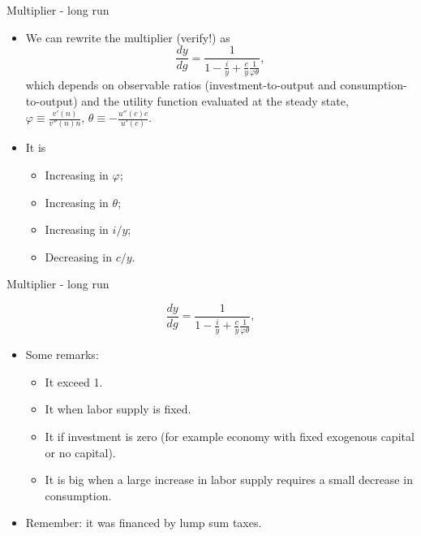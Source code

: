 \documentclass[11pt,xcolor={dvipsnames},aspectratio=159,hyperref={pdftex,pdfpagemode=UseNone,hidelinks,pdfdisplaydoctitle=true},usepdftitle=false]{beamer}
\begin{document}
        \begin{frame}{Multiplier - long run}
        \begin{itemize}
        \item We can rewrite the multiplier (verify!) as
        \[
        \frac{dy}{dg}=\frac{1}{1-\frac{i}{y}+\frac{c}{y}\frac{1}{\varphi\theta}},
        \]
        which depends on observable ratios (investment-to-output and consumption-to-output)
        and the utility function evaluated at the steady state, $\varphi\equiv\frac{v'\left(n\right)}{v''\left(n\right)n},\,\theta\equiv-\frac{u''\left(c\right)c}{u'\left(c\right)}$.
        \item It is
        \begin{itemize}
        \item Increasing in $\varphi$;
        \item Increasing in $\theta$;
        \item Increasing in $i/y$;
        \item Decreasing in $c/y$.
        \end{itemize}
        \end{itemize}
        \end{frame}
        \begin{frame}{Multiplier - long run}
        
        \[
        \frac{dy}{dg}=\frac{1}{1-\frac{i}{y}+\frac{c}{y}\frac{1}{\varphi\theta}},
        \]
        
        \begin{itemize}
        \item Some remarks:
        \begin{itemize}
        \item It  exceed 1.
        \item It  when labor supply is fixed.
        \item It  if investment is zero (for example economy with
        fixed exogenous capital or no capital).
        \item It is big when a large increase in labor supply requires a small decrease
        in consumption.
        \end{itemize}
        \item Remember: it was financed by lump sum taxes.
        \end{itemize}
        \end{frame}
\end{document}
